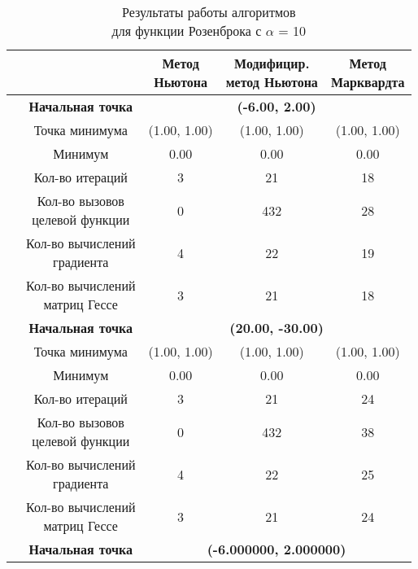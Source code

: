 \begin{table}[H]
        \centering
        \vspace*{-1.5em}
        \caption{Результаты работы алгоритмов\\для функции Розенброка с $\alpha$ = 10}
        \footnotesize
        \begin{tabular}{|c|c|c|c|c|}
        \hline
        & &\makecell{Метод\\Ньютона} &\makecell{Модифицир.\\метод Ньютона} &\makecell{Метод\\Марквардта} \\
        \hline
	\multirow{12}{*}{\rotatebox[origin=c]{90}{$\varepsilon = 0.01$}}&\textbf{Начальная точка} &\multicolumn{3}{c|}{\textbf{(-6.00, 2.00)}}\\
	\cline{2-5}
	&Точка минимума &(1.00, 1.00) &(1.00, 1.00) &(1.00, 1.00) \\ 
	\cline{2-5}
	&Минимум &0.00 &0.00 &0.00 \\ 
	\cline{2-5}
	&Кол-во итераций &3 &21 &18 \\ 
	\cline{2-5}
	&\makecell{Кол-во вызовов\\целевой функции} &0 &432 &28 \\ 
	\cline{2-5}
	&\makecell{Кол-во вычислений\\градиента} &4 &22 &19 \\ 
	\cline{2-5}
	&\makecell{Кол-во вычислений\\матриц Гессе} &3 &21 &18 \\ 
	\cline{2-5}
\cline{2-5}&\textbf{Начальная точка} &\multicolumn{3}{c|}{\textbf{(20.00, -30.00)}}\\
	\cline{2-5}
	&Точка минимума &(1.00, 1.00) &(1.00, 1.00) &(1.00, 1.00) \\ 
	\cline{2-5}
	&Минимум &0.00 &0.00 &0.00 \\ 
	\cline{2-5}
	&Кол-во итераций &3 &21 &24 \\ 
	\cline{2-5}
	&\makecell{Кол-во вызовов\\целевой функции} &0 &432 &38 \\ 
	\cline{2-5}
	&\makecell{Кол-во вычислений\\градиента} &4 &22 &25 \\ 
	\cline{2-5}
	&\makecell{Кол-во вычислений\\матриц Гессе} &3 &21 &24 \\ 
	\cline{2-5}
	\hline
	\multirow{12}{*}{\rotatebox[origin=c]{90}{$\varepsilon = 1e-06$}}&\textbf{Начальная точка} &\multicolumn{3}{c|}{\textbf{(-6.000000, 2.000000)}}\\

\end{tabular}
\end{table}
